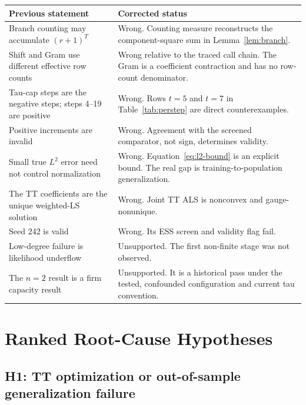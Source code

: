 \documentclass[11pt]{article}
\begin{document}
\begin{center}
\begin{tabular}{p{}p{}}
\toprule
Previous statement & Corrected status\\
\midrule
Branch counting may accumulate $(r+1)^T$ &
Wrong. Counting measure reconstructs the component-square sum in
Lemma~\ref{lem:branch}.\\
Shift and Gram use different effective row counts &
Wrong relative to the traced call chain. The Gram is a coefficient
contraction and has no row-count denominator.\\
Tau-cap steps are the negative steps; steps 4--19 are positive &
Wrong. Rows $t=5$ and $t=7$ in Table~\ref{tab:perstep} are direct
counterexamples.\\
Positive increments are invalid &
Wrong. Agreement with the screened comparator, not sign, determines
validity.\\
Small true $L^2$ error need not control normalization &
Wrong. Equation~\eqref{eq:l2-bound} is an explicit bound. The real gap is
training-to-population generalization.\\
The TT coefficients are the unique weighted-LS solution &
Wrong. Joint TT ALS is nonconvex and gauge-nonunique.\\
Seed 242 is valid &
Wrong. Its ESS screen and validity flag fail.\\
Low-degree failure is likelihood underflow &
Unsupported. The first non-finite stage was not observed.\\
The $n=2$ result is a firm capacity result &
Unsupported. It is a historical pass under the tested, confounded
configuration and current tau convention.\\
\bottomrule
\end{tabular}
\end{center}

\section{Ranked Root-Cause Hypotheses}

\subsection{H1: TT optimization or out-of-sample generalization failure}
\end{document}
